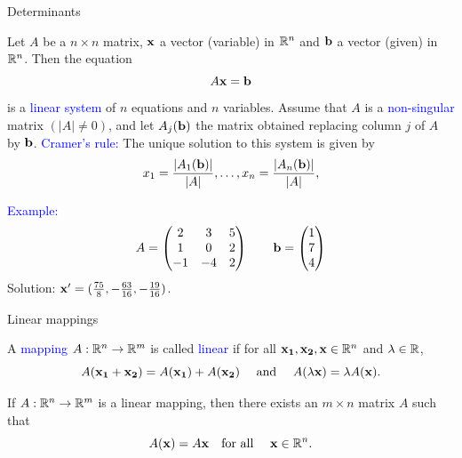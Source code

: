 \documentclass[11pt,aspectratio=169]{beamer}
\begin{document}
\begin{frame}{Determinants}

Let $A$ be a $n \times n$ matrix, $\bf{x}$ a vector (variable) in $\mathbb R^n$ and $\bf{b}$ a vector (given) in $\mathbb R^n$. Then the equation $$A\bf{x}=\bf{b}$$ is a \textcolor{blue}{linear system} of $n$ equations and $n$ variables.
\vskip 10pt
Assume that $A$ is a \textcolor{blue}{non-singular} matrix $(\vert A \vert \neq 0)$, and let $A_j(\bf{b})$ the matrix obtained replacing column $j$ of $A$ by $\bf{b}$.
\vskip 10pt
\textcolor{blue}{Cramer's rule:} The unique solution to this system is given by
$$
x_1=\frac{\vert A_1(\bf{b})\vert}{\vert A \vert}, \dots, x_n=\frac{\vert A_n(\bf{b})\vert }{\vert A \vert},
$$

\textcolor{blue}{Example:}
 \begin{equation*} 
 A=\begin{pmatrix}
2 & 3 & 5\\
1 & 0 & 2 \\
-1 & -4 & 2
\end{pmatrix}\qquad
\bf{b}= \begin{pmatrix}
1\\
7 \\
4
\end{pmatrix}
\end{equation*}
Solution: ${\bf x}'=(\frac{75}{8},-\frac{63}{16}, -\frac{19}{16})$.\end{frame}
\begin{frame}{Linear mappings}

A \textcolor{blue}{mapping} $A: \mathbb{R}^n\rightarrow \mathbb R^m$ is called \textcolor{blue}{linear} if for all ${\bf x_1},  {\bf x_2}, {\bf x} \in \mathbb{R}^n$ and $\lambda \in \mathbb R$,
$$  
A({\bf x_1}+{\bf x_2})=A({\bf x_1})+A({\bf x_2}) \quad \text{ and } \quad
A(\lambda {\bf x})= \lambda A({\bf x}).
$$

\vskip 12pt
If $A:\mathbb{R}^n\rightarrow \mathbb R^m$ is a linear mapping, then there exists an $m \times n$ matrix $A$ such that $$A({\bf x})=A {\bf x} \quad \text{for all }\quad {\bf x} \in \mathbb R^n.$$

\end{frame}
\end{document}
